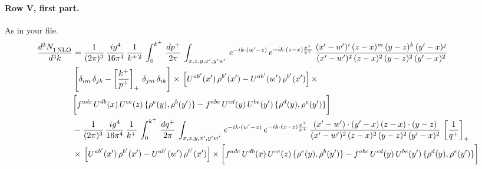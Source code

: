 \documentclass[10pt]{article}
\numberwithin{equation}{section}
\begin{document}
\paragraph{Row V, first part.}
As in your file.
\begin{align}
     \frac{d^{3}N_{1\,\rm NLO}^{\rm}}{d^{3}k}  & =  \frac{1}{(2\pi)^{3}}\, \frac{ig^{4}}{16\pi^{4}}\, \frac{1}{k^{+\,2}}\,\int_{0}^{k^{+}}\, \frac{dp^{+}}{2\pi}\,\int_{x,z,y,x',y'w'}\,e^{-ik\cdot (w^\prime-z)}\,e^{-ik\cdot (z-x)\frac{p^{+}}{k^{+}}}\,\frac{(x'-w')^{i}\,(z-x)^{m}\,(y-z)^{k}\,(y'-x)^{j}}{(x'-w')^{2}\,(z-x)^{2}\,(y-z)^{2}\,(y'-x)^{2}}\,\notag \\ & \left[\delta_{im}\,\delta_{jk}-\left[\frac{k^{+}}{p^{+}}\right]_{+}\, \delta_{jm}\,\delta_{ik}\right]\times\, \left[U^{ab'}(x')\,\rho^{b'}(x')-U^{ab'}(w')\,\rho^{b'}(x')\right]\times\notag \\ & \bigg[f^{adc}\,U^{db}(x)\,U^{ce}(z)\, \{\rho^{e}(y),\rho^{b}(y')\}-f^{abc}\,U^{cd}(y)\,U^{be}(y')\, \{\rho^{d}(y),\rho^{e}(y')\}\bigg] \notag \\
& -\frac{1}{(2\pi)^{3}}\, \frac{ig^{4}}{16\pi^{4}}\, \frac{1}{k^{+}}\,\int_{0}^{k^{+}}\, \frac{dq^{+}}{2\pi}\,\int_{x,z,y,x',y'w'}\,e^{-ik\cdot (w^\prime-x)}\,e^{-ik\cdot (x-z)\frac{q^{+}}{k^{+}}}\,\frac{(x'-w')\cdot (y'-x)\,(z-x)\cdot (y-z)}{(x'-w')^{2}\,(z-x)^{2}\,(y-z)^{2}\,(y'-x)^{2}}\,\left[\frac{1}{q^{+}}\right]_{+}\notag \\ & \times\, \left[U^{ab'}(x')\,\rho^{b'}(x')-U^{ab'}(w')\,\rho^{b'}(x')\right]\times \bigg[f^{adc}\,U^{db}(x)\,U^{ce}(z)\, \{\rho^{e}(y),\rho^{b}(y')\}-f^{abc}\,U^{cd}(y)\,U^{be}(y')\, \{\rho^{d}(y),\rho^{e}(y')\}\bigg] \label{eq:R:G1V1}
\end{align}
\end{document}
